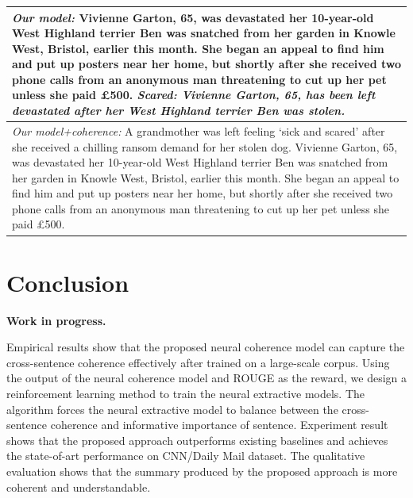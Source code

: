 \documentclass[letterpaper]{article} %
\begin{document}
\begin{table}[ht]
\begin{tabular}{|p{80mm}|}
			\small{\textit{Our model:} Vivienne Garton, 65, was devastated her 10-year-old West Highland terrier Ben was snatched from her garden in Knowle West, Bristol, earlier this month. She began an appeal to find him and put up posters near her home, but shortly after she received two phone calls from an anonymous man threatening to cut up her pet unless she paid £500. \textit{Scared: Vivienne Garton, 65, has been left devastated after her West Highland terrier Ben was stolen.}}\\\hline
			
			\small{\textit{Our model+coherence:} A grandmother was left feeling `sick and scared' after she received a chilling ransom demand for her stolen dog. Vivienne Garton, 65, was devastated her 10-year-old West Highland terrier Ben was snatched from her garden in Knowle West, Bristol, earlier this month. She began an appeal to find him and put up posters near her home, but shortly after she received two phone calls from an anonymous man threatening to cut up her pet unless she paid £500.} \\\hline
		\end{tabular}
	\end{table}
	
	
	\section{Conclusion}
	\textbf{Work in progress.}
	
	Empirical results show that the proposed neural coherence model can capture the cross-sentence coherence effectively after trained on a large-scale corpus. Using the output of the neural coherence model and ROUGE as the reward, we design a reinforcement learning method to train the neural extractive models. The algorithm forces the neural extractive model to balance between the cross-sentence coherence and informative importance of sentence. Experiment result shows that the proposed approach outperforms existing baselines and achieves the state-of-art performance on CNN/Daily Mail dataset. The qualitative evaluation shows that the summary produced by the proposed approach is more coherent and understandable.
	
	\clearpage
	
	
	
\end{document}
